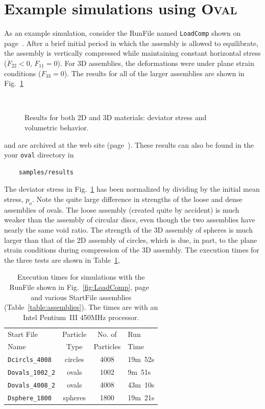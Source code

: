\documentclass[letterpaper,11pt]{article}
\newcommand{\Oval}{\textsc{Oval}}
\begin{document}
\section{Example simulations using \Oval}
As an example simulation, consider the \textsf{RunFile}
named \texttt{LoadComp}
shown on page~\pageref{fig:LoadComp}.
After a brief initial period in which the assembly is allowed to
equilibrate,
the assembly is vertically compressed while maintaining constant
horizontal stress ($\dot{F}_{22}<0$, $\dot{F}_{11}=0$).
For 3D assemblies, the deformations were under 
plane strain conditions ($\dot{F}_{33}=0$).
The results for all of the larger assemblies are shown in
Fig.~\ref{fig:results_all}
\begin{figure}\small
\centering
\subfigure[]
{}\\
\subfigure[]
{}
\caption{Results for both 2D and 3D materials: deviator stress and volumetric
behavior.}
\label{fig:results_all}
\end{figure}
and are archived at the web site (page~\pageref{page:WebSite}).
These results can also be found in the your \texttt{oval} directory in
\begin{verbatim}
    samples/results
\end{verbatim}
The deviator stress in Fig.~\ref{fig:results_all} has been normalized by
dividing by the initial mean stress, $p_{\mathrm{o}}$.
Note the quite large difference in strengths of the
loose and dense assemblies of ovals.
The loose assembly (created quite by accident)
is much weaker than the assembly of circular discs, even though
the two assemblies have nearly the same void ratio.
The strength of the 3D assembly of spheres is much larger than
that of the 2D assembly of circles, which is due, in part, to the
plane strain conditions during compression of the 3D assembly.
The execution times for the three 
tests are shown in Table~\ref{fig:runtimes},
\begin{table}
\centering
\begin{tabular}{lccl}
\hline
\hline
Start File& Particle & No. of    & Run  \\
Name      &   Type   & Particles & Time \\
\hline
\texttt{Dcircls\_4008}   & circles & 4008 & 19m\ 52s\\
\texttt{Dovals\_1002\_2} & ovals   & 1002 &  9m\ 51s \\
\texttt{Dovals\_4008\_2} & ovals   & 4008 & 43m\ 10s \\
\texttt{Dsphere\_1800}   & spheres & 1800 & 19m\ 21s \\
\hline
\hline
\end{tabular}
\caption{Execution times for simulations with
the \textsf{RunFile} shown in Fig.~\ref{fig:LoadComp},
page~\pageref{fig:LoadComp} and various 
\textsf{StartFile} assemblies (Table~\ref{table:assemblies}).
The times are with an Intel Pentium~III 450MHz processor.}
\label{fig:runtimes}
\end{table}
\end{document}
